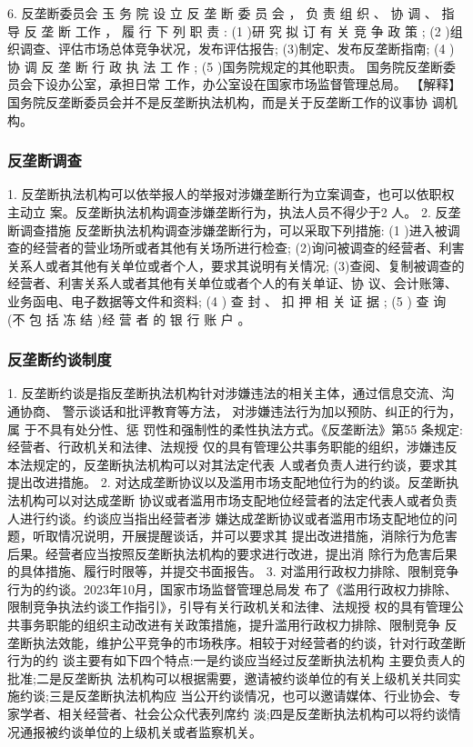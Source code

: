 \documentclass[UTF8,12pt]{ctexart}
\numberwithin{equation}{section} %
\numberwithin{figure}{section}
\numberwithin{table}{section}
\begin{document}
	6. 反垄断委员会
	玉 务 院 设 立 反 垄 断 委 员 会 ， 负 责 组 织 、 协 调 、 指 导 反 垄 断 工作 ， 履 行 下 列 职 责 :
	(1 )研 究 拟 订 有 关 竞 争 政 策 ;
	(2 )组织调查、评估市场总体竞争状况，发布评估报告;
	(3)制定、发布反垄断指南;
	(4 ) 协 调 反 垄 断 行 政 执 法 工 作 ;
	(5 )国务院规定的其他职责。
	国务院反垄断委员会下设办公室，承担日常 工作，办公室设在国家市场监督管理总局。
	【解释】国务院反垄断委员会并不是反垄断执法机构，而是关于反垄断工作的议事协
	调机构。
	
	\subsubsection{反垄断调查}
	1. 反垄断执法机构可以依举报人的举报对涉嫌垄断行为立案调查，也可以依职权主动立
	案。反垄断执法机构调查涉嫌垄断行为，执法人员不得少于2 人。
	2. 反垄断调查措施
	反垄断执法机构调查涉嫌垄断行为，可以采取下列措施:
	(1 )进入被调查的经营者的营业场所或者其他有关场所进行检查;
	(2)询问被调查的经营者、利害关系人或者其他有关单位或者个人，要求其说明有关情况;
	(3)查阅、复制被调查的经营者、利害关系人或者其他有关单位或者个人的有关单证、协
	议、会计账簿、业务函电、电子数据等文件和资料;
	(4 ) 查 封 、 扣 押 相 关 证 据 ;
	(5 ) 查 询 (不 包 括 冻 结 )经 营 者 的 银 行 账 户 。
	
	\subsubsection{反垄断约谈制度}
	1. 反垄断约谈是指反垄断执法机构针对涉嫌违法的相关主体，通过信息交流、沟通协商、
	警示谈话和批评教育等方法， 对涉嫌违法行为加以预防、纠正的行为，属 于不具有处分性、惩
	罚性和强制性的柔性执法方式。《反垄断法》第55 条规定:经营者、行政机关和法律、法规授
	仅的具有管理公共事务职能的组织，涉嫌违反本法规定的，反垄断执法机构可以对其法定代表
	人或者负责人进行约谈，要求其提出改进措施。
	2. 对达成垄断协议以及滥用市场支配地位行为的约谈。反垄断执法机构可以对达成垄断
	协议或者滥用市场支配地位经营者的法定代表人或者负责人进行约谈。约谈应当指出经营者涉
	嫌达成垄断协议或者滥用市场支配地位的问题，听取情况说明，开展提醒谈话，并可以要求其
	提出改进措施，消除行为危害后果。经营者应当按照反垄断执法机构的要求进行改进，提出消
	除行为危害后果的具体措施、履行时限等，并提交书面报告。
	3. 对滥用行政权力排除、限制竞争行为的约谈。2023年10月，国家市场监督管理总局发
	布了《滥用行政权力排除、限制竞争执法约谈工作指引》，引导有关行政机关和法律、法规授
	权的具有管理公共事务职能的组织主动改进有关政策措施，提升滥用行政权力排除、限制竞争
	反垄断执法效能，维护公平竞争的市场秩序。相较于对经营者的约谈，针对行政垄断行为的约
	谈主要有如下四个特点:一是约谈应当经过反垄断执法机构 主要负责人的批准;二是反垄断执
	法机构可以根据需要，邀请被约谈单位的有关上级机关共同实施约谈;三是反垄断执法机构应
	当公开约谈情况，也可以邀请媒体、行业协会、专家学者、相关经营者、社会公众代表列席约
	淡;四是反垄断执法机构可以将约谈情况通报被约谈单位的上级机关或者监察机关。
	
\end{document}
